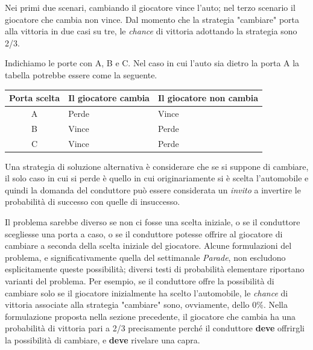 \documentclass[a4paper, 12pt]{report}
\begin{document}
Nei primi due scenari, cambiando il giocatore vince l'auto; nel terzo scenario il giocatore che cambia non vince. Dal momento che la strategia "cambiare" porta alla vittoria in due casi su tre, le \textit{chance} di vittoria adottando la strategia sono 2/3.

Indichiamo le porte con A, B e C. Nel caso in cui l'auto sia dietro la porta A la tabella potrebbe essere come la seguente.

\begin{table}[htbp]
	\centering
	\begin{tabular}{|c|l|l|}
		\hline
		\textbf{Porta scelta} & \multicolumn{1}{c|}{\textbf{Il giocatore cambia}} & \multicolumn{1}{c|}{\textbf{Il giocatore non cambia}} \\ \hline
		A                     & Perde                                             & Vince                                                 \\ \hline
		B                     & Vince                                             & Perde                                                 \\ \hline
		C                     & Vince                                             & Perde                                                 \\ \hline
	\end{tabular}
\end{table}

Una strategia di soluzione alternativa è considerare che se si suppone di cambiare, il solo caso in cui si perde è quello in cui originariamente si è scelta l'automobile e quindi la domanda del conduttore può essere considerata un \textit{invito} a invertire le probabilità di successo con quelle di insuccesso.

Il problema sarebbe diverso se non ci fosse una scelta iniziale, o se il conduttore scegliesse una porta a caso, o se il conduttore potesse offrire al giocatore di cambiare a seconda della scelta iniziale del giocatore. Alcune formulazioni del problema, e significativamente quella del settimanale \textit{Parade}, non escludono esplicitamente queste possibilità; diversi testi di probabilità elementare riportano varianti del problema. Per esempio, se il conduttore offre la possibilità di cambiare solo se il giocatore inizialmente ha scelto l'automobile, le \textit{chance} di vittoria associate alla strategia "cambiare" sono, ovviamente, dello 0\%. Nella formulazione proposta nella sezione precedente, il giocatore che cambia ha una probabilità di vittoria pari a 2/3 precisamente perché il conduttore \textbf{deve} offrirgli la possibilità di cambiare, e \textbf{deve} rivelare una capra.
\end{document}
